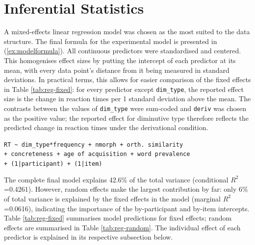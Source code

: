 \section{Inferential Statistics} \label{sec:inf_stats}
A mixed-effects linear regression model was chosen as the most suited to the data structure. The final formula for the experimental model is presented in (\ref{ex:modelformula}). All continuous predictors were standardised and centered. This homogenises effect sizes by putting the intercept of each predictor at its mean, with every data point's distance from it being measured in standard deviations. In practical terms, this allows for easier comparison of the fixed effects in Table \ref{tab:reg-fixed}: for every predictor except \texttt{dim\_type}, the reported effect size is the change in reaction times per 1 standard deviation above the mean. The contrasts between the values of \texttt{dim\_type} were sum-coded and \texttt{deriv} was chosen as the positive value; the reported effect for diminutive type therefore reflects the predicted change in reaction times under the derivational condition.

\begin{exe}
\ex \label{ex:modelformula}
\texttt{RT \textasciitilde ~dim\_type*frequency + nmorph + orth. similarity \\ 
+ concreteness + age of acquisition + word prevalence \\
+ (1|participant) + (1|item)}
\end{exe}

The complete final model explains 42.6\% of the total variance (conditional $R^2$=0.4261). However, random effects make the largest contribution by far: only 6\% of total variance is explained by the fixed effects in the model (marginal $R^2$=0.0616), indicating the importance of the by-participant and by-item intercepts. Table \ref{tab:reg-fixed} summarises model predictions for fixed effects; random effects are summarised in Table \ref{tab:reg-random}. The individual effect of each predictor is explained in its respective subsection below.

